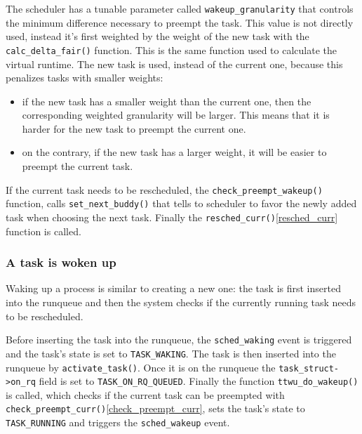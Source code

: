 \documentclass[10pt, oneside]{book}
\begin{document}
The scheduler has a tunable parameter called \verb|wakeup_granularity| that controls the minimum difference necessary to preempt the task. This value is not directly used, instead it's first weighted by the weight of the new task with the \verb|calc_delta_fair()| function.  This is the same function used to calculate the virtual runtime. The new task is used, instead of the current one, because this penalizes tasks with smaller weights:
\begin{itemize}
    \item if the new task has a smaller weight than the current one, then the corresponding weighted granularity will be larger. This means that it is harder for the new task to preempt the current one.
    
    \item on the contrary, if the new task has a larger weight, it will be easier to preempt the current task. 
\end{itemize}

If the current task needs to be rescheduled, the \verb|check_preempt_wakeup()| function, calls \verb|set_next_buddy()| that tells to scheduler to favor the newly added task when choosing the next task. Finally the \verb|resched_curr()|\ref{resched_curr} function is called.

\subsubsection{A task is woken up}

Waking up a process is similar to creating a new one: the task is first inserted into the runqueue and then the system checks if the currently running task needs to be rescheduled.

Before inserting the task into the runqueue, the \verb|sched_waking|\label{trace:sched_waking} event is triggered and the task's state is set to \verb|TASK_WAKING|. The task is then inserted into the runqueue by \verb|activate_task()|. Once it is on the runqueue the \verb|task_struct->on_rq| field  is set to \verb|TASK_ON_RQ_QUEUED|. Finally the function \verb|ttwu_do_wakeup()| is called, which checks if the current task can be preempted with \verb|check_preempt_curr()|\ref{check_preempt_curr}, sets the task's state to \verb|TASK_RUNNING| and triggers the \verb|sched_wakeup|\label{trace:sched_wakeup} event.
\end{document}
